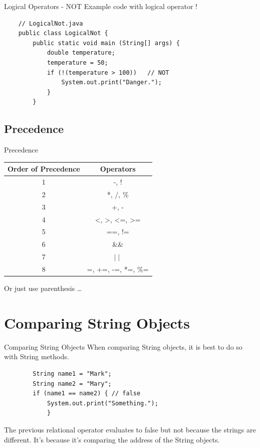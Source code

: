 \documentclass[11pt]{beamer}
\begin{document}
\begin{frame}[fragile]{Logical Operators - NOT}
    Example code with logical operator !
    \begin{lstlisting}
    // LogicalNot.java
    public class LogicalNot {
    	public static void main (String[] args) {
    		double temperature;
    		temperature = 50;
    		if (!(temperature > 100))	// NOT
    			System.out.print("Danger.");
    		}
        }
    \end{lstlisting}
\end{frame}

\subsection{Precedence}
\begin{frame}{Precedence}
    \begin{table}[]
    \begin{tabular}{|c|c|}
    \hline
    Order of Precedence & Operators                                                  \\ \hline
    1                   & -, !                                                       \\ \hline
    2                   & *, /, \%                                                   \\ \hline
    3                   & +, -                                                       \\ \hline
    4                   & \textless{}, \textgreater{}, \textless{}=, \textgreater{}= \\ \hline
    5                   & ==, !=                                                     \\ \hline
    6                   & \&\&                                                       \\ \hline
    7                   & $\mid \mid$                                                \\ \hline
    8                   & =, +=, -=, *=, \%=                                         \\ \hline
    \end{tabular}
    \end{table}
    Or just use parenthesis \ldots
\end{frame}

\section{Comparing String Objects}
\begin{frame}[fragile]{Comparing String Objects}
    When comparing {String} objects, it is best to do so with String methods.
        \begin{lstlisting}
        String name1 = "Mark";
        String name2 = "Mary";
        if (name1 == name2) { // false
            System.out.print("Something.");
            }
    \end{lstlisting}
    The previous relational operator evaluates to false but not because the strings are different. It's because it's comparing the address of the String objects.
\end{frame}
\end{document}
